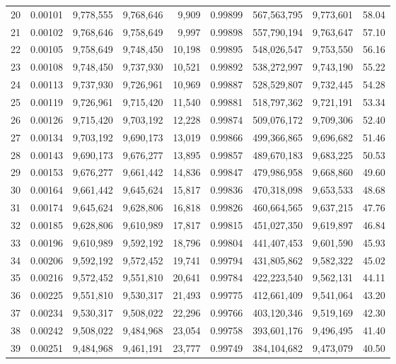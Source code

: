 \begin{longtable}{rrrrrrrrr}
20 & 0.00101 & 9,778,555 & 9,768,646 & 9,909 & 0.99899 & 567,563,795 & 9,773,601 & 58.04 \\
21 & 0.00102 & 9,768,646 & 9,758,649 & 9,997 & 0.99898 & 557,790,194 & 9,763,647 & 57.10 \\
22 & 0.00105 & 9,758,649 & 9,748,450 & 10,198 & 0.99895 & 548,026,547 & 9,753,550 & 56.16 \\
23 & 0.00108 & 9,748,450 & 9,737,930 & 10,521 & 0.99892 & 538,272,997 & 9,743,190 & 55.22 \\
24 & 0.00113 & 9,737,930 & 9,726,961 & 10,969 & 0.99887 & 528,529,807 & 9,732,445 & 54.28 \\
25 & 0.00119 & 9,726,961 & 9,715,420 & 11,540 & 0.99881 & 518,797,362 & 9,721,191 & 53.34 \\
26 & 0.00126 & 9,715,420 & 9,703,192 & 12,228 & 0.99874 & 509,076,172 & 9,709,306 & 52.40 \\
27 & 0.00134 & 9,703,192 & 9,690,173 & 13,019 & 0.99866 & 499,366,865 & 9,696,682 & 51.46 \\
28 & 0.00143 & 9,690,173 & 9,676,277 & 13,895 & 0.99857 & 489,670,183 & 9,683,225 & 50.53 \\
29 & 0.00153 & 9,676,277 & 9,661,442 & 14,836 & 0.99847 & 479,986,958 & 9,668,860 & 49.60 \\
30 & 0.00164 & 9,661,442 & 9,645,624 & 15,817 & 0.99836 & 470,318,098 & 9,653,533 & 48.68 \\
31 & 0.00174 & 9,645,624 & 9,628,806 & 16,818 & 0.99826 & 460,664,565 & 9,637,215 & 47.76 \\
32 & 0.00185 & 9,628,806 & 9,610,989 & 17,817 & 0.99815 & 451,027,350 & 9,619,897 & 46.84 \\
33 & 0.00196 & 9,610,989 & 9,592,192 & 18,796 & 0.99804 & 441,407,453 & 9,601,590 & 45.93 \\
34 & 0.00206 & 9,592,192 & 9,572,452 & 19,741 & 0.99794 & 431,805,862 & 9,582,322 & 45.02 \\
35 & 0.00216 & 9,572,452 & 9,551,810 & 20,641 & 0.99784 & 422,223,540 & 9,562,131 & 44.11 \\
36 & 0.00225 & 9,551,810 & 9,530,317 & 21,493 & 0.99775 & 412,661,409 & 9,541,064 & 43.20 \\
37 & 0.00234 & 9,530,317 & 9,508,022 & 22,296 & 0.99766 & 403,120,346 & 9,519,169 & 42.30 \\
38 & 0.00242 & 9,508,022 & 9,484,968 & 23,054 & 0.99758 & 393,601,176 & 9,496,495 & 41.40 \\
39 & 0.00251 & 9,484,968 & 9,461,191 & 23,777 & 0.99749 & 384,104,682 & 9,473,079 & 40.50 \\

\end{longtable}
